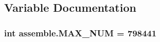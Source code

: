 \subsection{Variable Documentation}
\hypertarget{namespaceassemble_a8f8b5fb9cb64b69c5673358937accbf3}{
\subsubsection[{M\-A\-X\-\_\-\-N\-U\-M}]{\setlength{\rightskip}{0pt plus 5cm}int assemble.\-M\-A\-X\-\_\-\-N\-U\-M = 798441}}\label{namespaceassemble_a8f8b5fb9cb64b69c5673358937accbf3}
